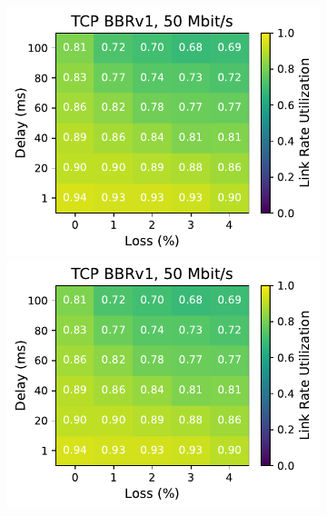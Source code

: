 \begin{figure}[ht]
\begin{subfigure}[b]{0.89cm}
        \includegraphics[width=\linewidth,trim={8cm 0 0 0},clip]{splitting-paper/figures/heatmaps/heatmap_tcp_bbr1_50mbps.pdf}
        \includegraphics[width=\linewidth,trim={8cm 0 0 0},clip]{splitting-paper/figures/heatmaps/heatmap_tcp_bbr1_50mbps.pdf}

\end{subfigure}
\end{figure}
